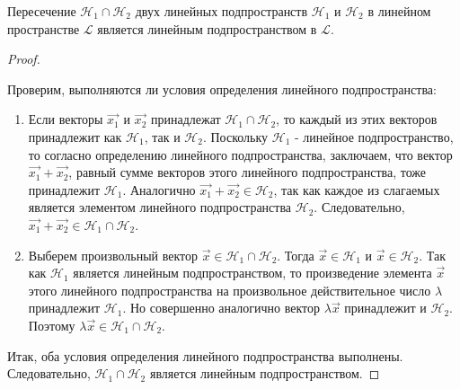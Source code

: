 \begin{theorem}
    Пересечение $\mathcal{H}_1 \cap \mathcal{H}_2$ двух линейных подпространств $\mathcal{H}_1$ и $\mathcal{H}_2$ в линейном пространстве $\mathcal{L}$ является линейным подпространством в $\mathcal{L}$.
\end{theorem}

\begin{proof}~

    Проверим, выполняются ли условия определения линейного подпространства:
    \begin{enumerate}[nosep]
        \item Если векторы $\vec{x_1}$ и $\vec{x_2}$ принадлежат $\mathcal{H}_1 \cap \mathcal{H}_2$, то каждый из этих векторов принадлежит как $\mathcal{H}_1$, так и $\mathcal{H}_2$. Поскольку $\mathcal{H}_1$ - линейное подпространство, то согласно определению линейного подпространства, заключаем, что вектор $\vec{x_1} + \vec{x_2}$, равный сумме векторов этого линейного подпространства, тоже принадлежит $\mathcal{H}_1$. Аналогично $\vec{x_1} + \vec{x_2} \in \mathcal{H}_2$, так как каждое из слагаемых является элементом линейного подпространства $\mathcal{H}_2$. Следовательно, $\vec{x_1} + \vec{x_2} \in \mathcal{H}_1 \cap \mathcal{H}_2$.
        \item Выберем произвольный вектор $\vec{x} \in \mathcal{H}_1 \cap \mathcal{H}_2$. Тогда $\vec{x} \in \mathcal{H}_1$ и $\vec{x} \in \mathcal{H}_2$. Так как $\mathcal{H}_1$ является линейным подпространством, то произведение элемента $\vec{x}$ этого линейного подпространства на произвольное действительное число $\lambda$ принадлежит $\mathcal{H}_1$. Но совершенно аналогично вектор $\lambda \vec{x}$ принадлежит и $\mathcal{H}_2$. Поэтому $\lambda \vec{x} \in \mathcal{H}_1 \cap \mathcal{H}_2$. 
    \end{enumerate}
    Итак, оба условия определения линейного подпространства выполнены. Следовательно, $\mathcal{H}_1 \cap \mathcal{H}_2$ является линейным подпространством.
\end{proof}
